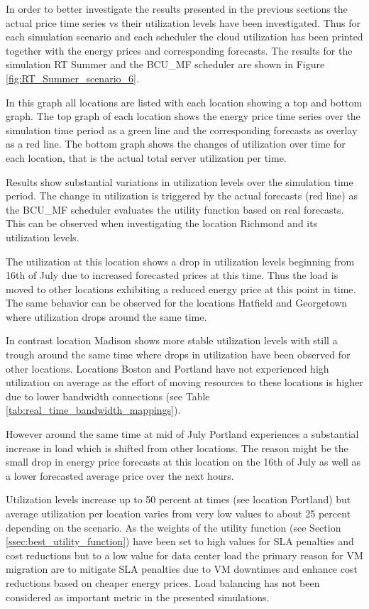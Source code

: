 In order to better investigate the results presented in the previous sections the actual price time series vs their utilization levels have been investigated. Thus for each simulation scenario and each scheduler the cloud utilization has been printed together with the energy prices and corresponding forecasts. The results for the simulation RT Summer and the BCU\_MF scheduler are shown in Figure \ref{fig:RT_Summer_scenario_6}.

In this graph all locations are listed with each location showing a top and bottom graph. The top graph of each location shows the energy price time series over the simulation time period as a green line and the corresponding forecasts as overlay as a red line. The bottom graph shows the changes of utilization over time for each location, that is the actual total server utilization per time. 

Results show substantial variations in utilization levels over the simulation time period. The change in utilization is triggered by the actual forecasts (red line) as the BCU\_MF scheduler evaluates the utility function based on real forecasts. This can be observed when investigating the location Richmond and its utilization levels. 

The utilization at this location shows a drop in utilization levels beginning from 16th of July due to increased forecasted prices at this time. Thus the load is moved to other locations exhibiting a reduced energy price at this point in time. The same behavior can be observed for the locations Hatfield and Georgetown where utilization drops around the same time. 

In contrast location Madison shows more stable utilization levels with still a trough around the same time where drops in utilization have been observed for other locations. Locations Boston and Portland have not experienced high utilization on average as the effort of moving resources to these locations is higher due to lower bandwidth connections (see Table \ref{tab:real_time_bandwidth_mappings}). 

However around the same time at mid of July Portland experiences a substantial increase in load which is shifted from other locations. The reason might be the small drop in energy price forecasts at this location on the 16th of July as well as a lower forecasted average price over the next hours. 

Utilization levels increase up to 50 percent at times (see location Portland) but average utilization per location varies from very low values to about 25 percent depending on the scenario. As the weights of the utility function (see Section \ref{ssec:best_utility_function}) have been set to high values for SLA penalties and cost reductions but to a low value for data center load the primary reason for VM migration are to mitigate SLA penalties due to VM downtimes and enhance cost reductions based on cheaper energy prices. Load balancing has not been considered as important metric in the presented simulations. 

